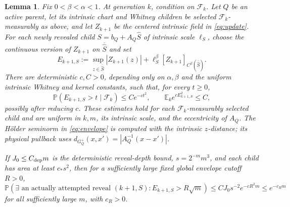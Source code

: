 \documentclass[11pt]{article}
\newtheorem{lemma}[lemma]{Lemma}
\theoremstyle{definition}
\theoremstyle{remark}
\numberwithin{equation}{section}
\newcommand{\E}{\mathbb E}
\newcommand{\Pp}{\mathbb P}
\newcommand{\F}{\mathcal F}
\begin{document}
\begin{lemma}\label{lem:envelope}
Fix $0<\beta<\alpha<1$. At generation $k$, condition on
$\F_k$. Let $Q$ be an active parent, let its intrinsic chart and
Whitney children be selected $\F_k$-measurably as above, and let
$Z_{k+1}$ be the centered intrinsic field in
\eqref{eq:update}. For each newly revealed child
$S=b_Q+A_Q\widehat S$ of intrinsic scale $\ell_S$, choose the
continuous version of $Z_{k+1}$ on $\overline{\widehat S}$ and set
\begin{equation}\label{eq:envelope}
 E_{k+1,S}:=
 \sup_{z\in\overline{\widehat S}}|Z_{k+1}(z)|
 +\ell_S^\beta[Z_{k+1}]_{C^\beta(\overline{\widehat S})}.
\end{equation}
There are deterministic $c,C>0$, depending only on
$\alpha,\beta$ and the uniform intrinsic Whitney and kernel
constants, such that, for every $t\ge0$,
\begin{equation}\label{eq:envelopetail}
 \Pp(E_{k+1,S}>t\mid\F_k)\le Ce^{-ct^2},
 \qquad \E_k e^{cE_{k+1,S}^2}\le C,
\end{equation}
possibly after reducing $c$. These estimates hold for each
$\F_k$-measurably selected child and are uniform in $k,m$,
its intrinsic scale, and the eccentricity of $A_Q$.
The H\"older seminorm in \eqref{eq:envelope} is computed with the
intrinsic $z$-distance; its physical pullback uses
$d_{G_Q^+}(x,x')=|A_Q^{-1}(x-x')|$.

If $J_0\le C_{\rm dep}m$ is the deterministic reveal-depth bound,
$s=2^{-m}m^3$, and each child has area at least $c_*s^2$,
then for a sufficiently large fixed \emph{global envelope cutoff}
$R>0$,
\begin{equation}\label{eq:globalcut}
 \Pp\!\left(\exists\text{ an actually attempted reveal }(k+1,S):
                 E_{k+1,S}>R\sqrt m\right)
 \le C J_0s^{-2}e^{-cR^2m}
 \le e^{-c_Rm}
\end{equation}
for all sufficiently large $m$, with $c_R>0$.
\end{lemma}
\end{document}

